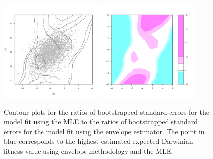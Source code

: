 \documentclass[12pt]{article}
\begin{document}
\begin{figure}[h!]
  \begin{center}
    \includegraphics[width = 0.45\textwidth]{ex1-ratios-Efron-1.pdf}
    \includegraphics[width = 0.45\textwidth]{ex1-ratios-Efron-2.pdf}
  \end{center}
  \caption{Contour plots for the ratios of bootstrapped standard errors for 
  the model fit using the MLE to the ratios of bootstrapped standard errors 
  for the model fit using the envelope estimator. The point in blue 
  corresponds to the highest estimated expected Darwinian fitness value using 
  envelope methodology and the MLE. }
  \label{ex1-plots}
\end{figure}
\end{document}
